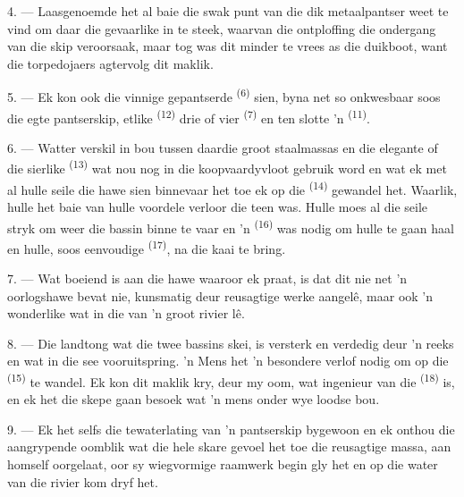 \VUsaut{3.0mm}
\VUsaut{3.0mm}

4. --- Laasgenoemde het al baie  die swak punt van die dik metaalpantser
weet te vind om daar die gevaarlike  in te steek, waarvan die ontploffing
die ondergang van die skip veroorsaak, maar tog was dit minder te vrees as die duikboot,
want die torpedojaers agtervolg dit maklik.

5. --- Ek kon ook die vinnige gepantserde  \textsuperscript{(6)} sien,
byna net so onkwesbaar soos die egte pantserskip, etlike 
\textsuperscript{(12)} drie of vier  \textsuperscript{(7)} en ten
slotte 'n  \textsuperscript{(11)}. 

6. --- Watter verskil in bou tussen daardie groot staalmassas en die elegante
 of die sierlike  \textsuperscript{(13)} wat nou
nog in die koopvaardyvloot gebruik word en wat ek met al hulle seile die hawe sien
binnevaar het toe ek op die  \textsuperscript{(14)} gewandel het. Waarlik,
hulle het baie van hulle voordele verloor  die  teen was.
Hulle moes al die seile stryk om weer die bassin binne te vaar en 'n 
\textsuperscript{(16)} was nodig om hulle te gaan haal en hulle, soos eenvoudige
 \textsuperscript{(17)}, na die kaai te bring.

\VUsaut{3.0mm}
\VUsaut{3.0mm}

7. --- Wat boeiend is aan die hawe waaroor ek praat, is dat dit nie net 'n oorlogshawe
bevat nie, kunsmatig deur reusagtige werke aangelê, maar ook 'n wonderlike
 wat in die  van 'n groot rivier lê.

8. --- Die landtong wat die twee bassins skei, is versterk en verdedig deur 'n reeks
 en  wat in die see vooruitspring. 'n Mens het 'n
besondere verlof nodig om op die  \textsuperscript{(15)} te wandel. Ek kon
dit maklik kry, deur my oom, wat ingenieur van die 
\textsuperscript{(18)} is, en ek het die skepe gaan besoek wat 'n mens onder wye loodse
bou.

9. --- Ek het selfs die tewaterlating van 'n pantserskip bygewoon en ek onthou die
aangrypende oomblik wat die hele skare gevoel het toe die reusagtige massa, aan homself
oorgelaat, oor sy wiegvormige raamwerk begin gly het en op die water van die rivier kom
dryf het.


